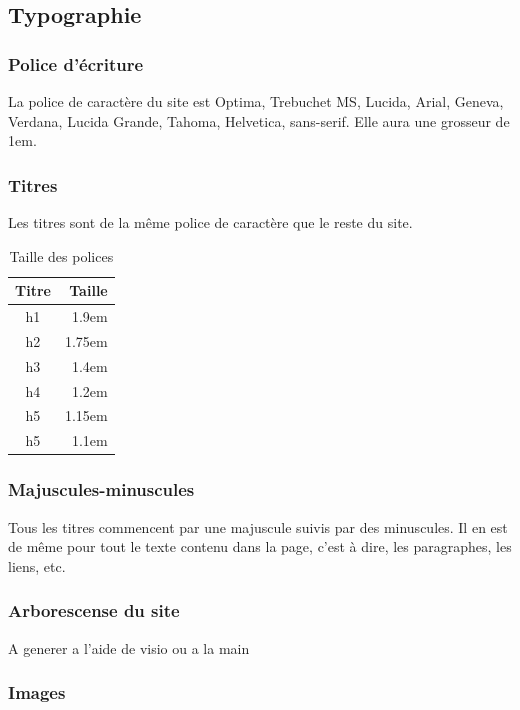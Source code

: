 \documentclass[letter, 11pt, draft]{report}
\begin{document}
\subsection{Typographie}

\subsubsection{Police d’écriture}

La police de caractère du site est Optima, Trebuchet MS, Lucida, Arial, Geneva, Verdana, Lucida Grande, Tahoma, Helvetica, sans-serif. Elle aura une grosseur de 1em.

\subsubsection{Titres}
Les titres sont de la même police de caractère que le reste du site. 

\begin{table}
	\caption{Taille des polices}
	\begin{center}
		\begin{tabular}{|c|r|}
			\hline
			Titre & Taille \\
			\hline
			h1  & 1.9em\\
			h2  & 1.75em\\
			h3  & 1.4em\\
			h4  & 1.2em\\
			h5  & 1.15em\\
			h5  & 1.1em\\
			\hline
		\end{tabular}
	\end{center}
\end{table}

\subsubsection{Majuscules-minuscules}

Tous les titres commencent par une majuscule suivis par des minuscules. Il en est de même pour tout le texte contenu dans la page, c'est à dire, les paragraphes, les liens, etc.

\subsubsection{Arborescense du site}

A generer a l'aide de visio ou a la main

\subsubsection{Images}
\end{document}
